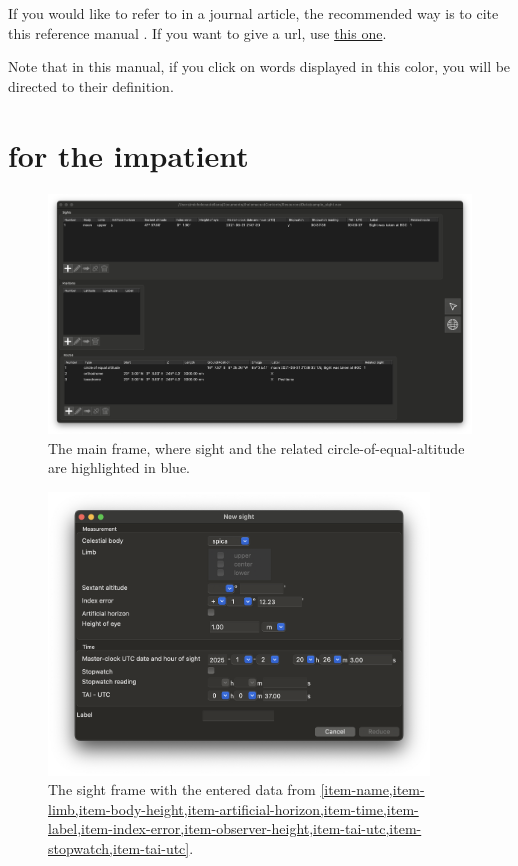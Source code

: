 \documentclass{ol-softwaremanual}
\begin{document}
If you would like to refer to \thel in a journal article, the recommended way is to cite this reference manual \cite{castellana2024thelemacus-documentation}. If you want to give a url, use  \href{\thelemacusurl}{this one}. 

\pagebreak

Note that in this manual, if you click on words displayed in {\color{glossary-link-color} this color}, you will be directed to their definition. 

\section{\thel for the impatient}\label{sec-impatient}

\begin{figure}
  \centering
  \includegraphics[width=1\textwidth]{figures/list-frame.png}
  \caption{
    \label{fig-list-frame}
    The main frame, where  \gls{sight} and the related \gls{circle-of-equal-altitude} are highlighted in blue.  
  }
  \end{figure}

  \begin{figure}
    \centering
    \includegraphics[width=0.9\textwidth]{figures/sight-frame.png}
    \caption{
      \label{fig-sight-frame}
      The \gls{sight} frame with the entered data from \cref{item-name,item-limb,item-body-height,item-artificial-horizon,item-time,item-label,item-index-error,item-observer-height,item-tai-utc,item-stopwatch,item-tai-utc}. 
    }
  \end{figure}
\end{document}
